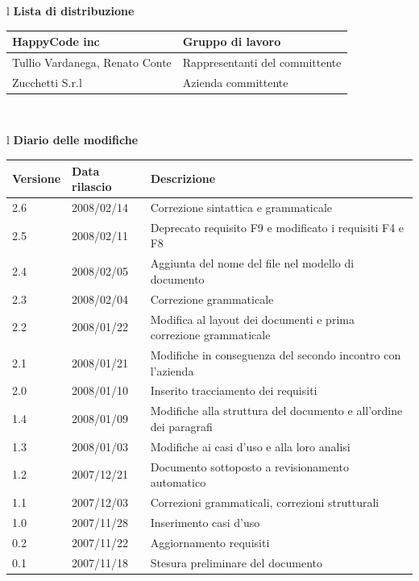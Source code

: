 \documentclass[11pt,titlepage,a4paper]{report}
\begin{document}
\begin{center}
\begin{table}[hbtp]
\large{
\begin{tabular}{l}
\Large{\textbf{\textsf{Lista di distribuzione}}} \\
\begin{tabular}{||p{6cm}||p{6cm}||} \hline
{HappyCode inc}& Gruppo di lavoro\\ \hline
{Tullio Vardanega, Renato Conte}& Rappresentanti del committente \\ \hline 
{Zucchetti S.r.l}& Azienda committente\\ \hline
\end{tabular} \\
\end{tabular}
}
\end{table}
\begin{table}[hbtp]
\large{
\begin{tabular}{l}
\Large{\textbf{\textsf{Diario delle modifiche}}} \\
\begin{tabular}{||p{2cm}||p{3.5cm}||p{6cm}||} \hline
\textbf{Versione} & \textbf{Data rilascio} & \textbf{Descrizione} \\ \hline
2.6 & 2008/02/14 & Correzione sintattica e grammaticale\\ \hline
2.5 & 2008/02/11 & Deprecato requisito F9 e modificato i requisiti F4 e F8\\ \hline
2.4 & 2008/02/05 & Aggiunta del nome del file nel modello di documento\\ \hline
2.3 & 2008/02/04 & Correzione grammaticale\\ \hline
2.2 & 2008/01/22 & Modifica al layout dei documenti e prima correzione grammaticale\\ \hline
2.1 & 2008/01/21 & Modifiche in conseguenza del secondo incontro con l'azienda\\ \hline
2.0 & 2008/01/10 & Inserito tracciamento dei requisiti\\ \hline
1.4 & 2008/01/09 & Modifiche alla struttura del documento e all'ordine dei paragrafi\\ \hline
1.3 & 2008/01/03 & Modifiche ai casi d'uso e alla loro analisi\\ \hline
1.2 & 2007/12/21 & Documento sottoposto a revisionamento automatico\\ \hline
1.1 & 2007/12/03 & Correzioni grammaticali, correzioni strutturali\\ \hline
1.0 & 2007/11/28 & Inserimento casi d'uso\\ \hline
0.2 & 2007/11/22 & Aggiornamento requisiti \\ \hline
0.1 & 2007/11/18 & Stesura preliminare del documento \\ \hline

\end{tabular} 
\end{tabular}

}
\end{table}
\end{center}
\newpage
\end{document}
